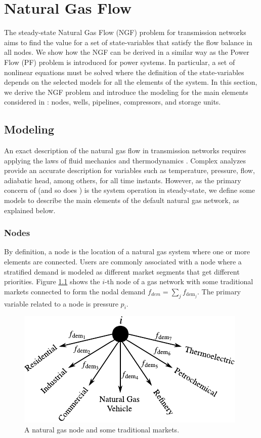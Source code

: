 \chapter{Natural Gas Flow}
\label{chap:fund_NGF}

The steady-state Natural Gas Flow (NGF) problem for transmission networks aims to find the value for a set of state-variables that satisfy the flow balance in all nodes. We show how the NGF can be derived in a similar way as the Power Flow (PF) problem is introduced for power systems. In  particular, a set of nonlinear equations must be solved where the definition of the state-variables depends on the selected models for all the elements of the system. In this section, we derive the NGF problem and introduce the modeling for the main elements considered in \mpng{}: nodes, wells, pipelines, compressors, and storage units.

\section{Modeling}
\label{sec:gas_modeling}

An exact description of the natural gas flow in transmission networks requires applying the laws of fluid mechanics and thermodynamics \cite{Osiadacz2001}. Complex analyzes provide an accurate description for variables such as temperature, pressure, flow, adiabatic head, among others, for all time instants. However, as the primary concern of \matpower{} (and so does \mpng{}) is the system operation in steady-state, we define some models to describe the main elements of the default natural gas network, as explained below. 

\subsection{Nodes}
\label{subsec:nodes}

By definition, a node is the location of a natural gas system where one or more elements are connected. Users are commonly associated with a node where a stratified demand is modeled as different market segments that get different priorities. Figure \ref{fig:node} shows the $i$-th node of a gas network with some traditional markets connected to form the nodal demand $f_{dem}=\sum_{j} f_{\text{dem}_j}$. The primary variable related to a node is pressure $p_i$.

\begin{figure}[!ht]
	\centering
	\includegraphics[scale=1.2]{Figures/Node}
	\caption{A natural gas node and some traditional markets.}	
	\label{fig:node}
\end{figure}



